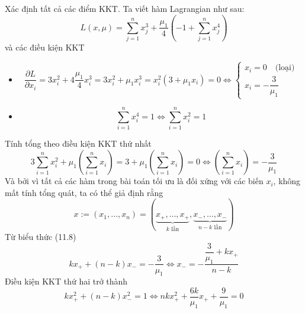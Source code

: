 \begin{solution}
     Xác định tất cả các điểm KKT. Ta viết hàm Lagrangian như sau:
        \begin{equation}
            L(x, \mu) = \sum_{j=1}^nx_j^3 + \dfrac{\mu_1}{4}\left(-1 + \sum_{j=1}^nx_j^4\right)
        \end{equation}
        và các điều kiện KKT
        \begin{itemize}
            \item \begin{equation}
                \dfrac{\partial L}{\partial x_i} = 3x_i^2 + 4\dfrac{\mu_1}{4} x_i^3 = 3x_i^2 + \mu_1x_i^3 = x_i^2(3+\mu_1x_i) = 0 \Leftrightarrow \begin{cases}
                    x_i = 0\quad\text{(loại)}\\
                    x_i = -\dfrac{3}{\mu_1}
                \end{cases}
            \end{equation}
            \item \begin{equation}
                \sum_{i=1}^nx_i^4 = 1 \Leftrightarrow \sum_{i=1}^nx_i^2 = 1 
            \end{equation}
        \end{itemize}
    Tính tổng theo điều kiện KKT thứ nhất
        \begin{equation}
            3\sum_{i=1}^nx_i^2 + \mu_1\left(\sum_{i=1}^nx_i\right) = 3 + \mu_1\left(\sum_{i=1}^nx_i\right) = 0 \Leftrightarrow \left(\sum_{i=1}^nx_i\right) = -\dfrac{3}{\mu_1}
        \end{equation}
        Và bởi vì tất cả các hàm trong bài toán tối ưu là đối xứng với các biến $x_i$, không mất tính tổng quát, ta có thể giả định rằng 
        \begin{equation}
            x := (x_1, \dots, x_n) = (\underset{k\text{ lần}}{\underbrace{x_{+}, \dots, x_{+}}},\underset{n-k\text{ lần}}{\underbrace{x_{-}, \dots, x_{-}}})
        \end{equation}
        Từ biểu thức (11.8)
        \begin{equation}
            kx_{+}+(n-k)x_{-} = -\dfrac{3}{\mu_1} \Leftrightarrow x_{-} = -\dfrac{\dfrac{3}{\mu_1}+kx_{+}}{n-k}
        \end{equation}
        Điều kiện KKT thứ hai trở thành
        \begin{equation}
            kx_{+}^2 + (n-k)x_{-}^2 = 1 \Leftrightarrow nkx_{+}^2 +\dfrac{6k}{\mu_1}x_{+} + \dfrac{9}{\mu_1} = 0
        \end{equation}

\end{solution}
